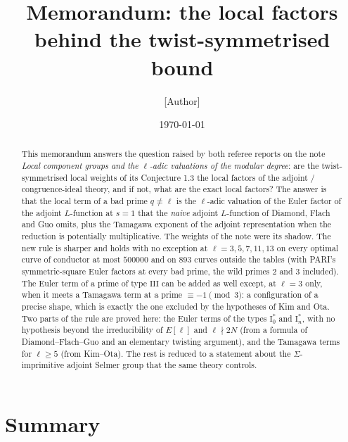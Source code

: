 \documentclass[11pt]{amsart}
\title{Memorandum: the local factors behind the twist-symmetrised bound}
\author{[Author]}
\date{\today}
\theoremstyle{definition}
\begin{document}
\begin{abstract}
This memorandum answers the question raised by both referee reports on the note \emph{Local component groups and the $\ell$-adic valuations of the modular degree}: are the twist-symmetrised local weights of its Conjecture 1.3 the local factors of the adjoint / congruence-ideal theory, and if not, what are the exact local factors? The answer is that the local term of a bad prime $q\ne\ell$ is the $\ell$-adic valuation of the Euler factor of the adjoint $L$-function at $s=1$ that the \emph{naive} adjoint $L$-function of Diamond, Flach and Guo omits, plus the Tamagawa exponent of the adjoint representation when the reduction is potentially multiplicative. The weights of the note were its shadow. The new rule is sharper and holds with no exception at $\ell=3,5,7,11,13$ on every optimal curve of conductor at most $500000$ and on $893$ curves outside the tables (with PARI's symmetric-square Euler factors at every bad prime, the wild primes $2$ and $3$ included). The Euler term of a prime of type $\mathrm{III}$ can be added as well except, at $\ell=3$ only, when it meets a Tamagawa term at a prime $\equiv-1\pmod3$: a configuration of a precise shape, which is exactly the one excluded by the hypotheses of Kim and Ota. Two parts of the rule are proved here: the Euler terms of the types $\mathrm{I}_0^*$ and $\mathrm{I}_n^*$, with no hypothesis beyond the irreducibility of $E[\ell]$ and $\ell\nmid 2N$ (from a formula of Diamond--Flach--Guo and an elementary twisting argument), and the Tamagawa terms for $\ell\ge5$ (from Kim--Ota). The rest is reduced to a statement about the $\Sigma$-imprimitive adjoint Selmer group that the same theory controls.
\end{abstract}
\maketitle

\section{Summary}\label{sec:summary}
\end{document}

